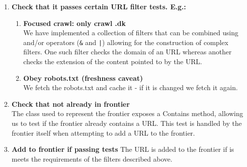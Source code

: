 \begin{enumerate}[label=\textbf{\arabic*.}]
\begin{enumerate}[label=\textbf{\alph*)}]
		\item \textbf{Check that it passes certain URL filter tests. E.g.:}
		\begin{enumerate}[label=\textbf{\roman*.}]
			\item \textbf{Focused crawl: only crawl .dk}\\
			We have implemented a collection of filters that can be combined using and/or operators (\texttt{\&} and \texttt{|}) allowing for the construction of complex filters.
			One such filter checks the domain of an URL whereas another checks the extension of the content pointed to by the URL.
			\item\textbf{Obey robots.txt (freshness caveat)}\\
			We fetch the robots.txt and cache it - if it is changed we fetch it again.
		\end{enumerate}
		
		\item \textbf{Check that not already in frontier}\\
		The class used to represent the frontier exposes a Contains method, allowing us to test if the frontier already contains a URL.
		This test is handled by the frontier itself when attempting to add a URL to the frontier.
		\item \textbf{Add to frontier if passing tests}
		The URL is added to the frontier if is meets the requirements of the filters described above.
	\end{enumerate}
\end{enumerate}
